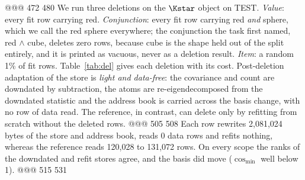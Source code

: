 @@@ 472 480
We run three deletions on the $\Kstar$ object on TEST. \emph{Value}: every fit row carrying
red. \emph{Conjunction}: every fit row carrying red \emph{and} sphere, which we call the red
sphere everywhere; the conjunction the task first named, red $\wedge$ cube, deletes zero rows,
because cube is the shape held out of the split entirely, and it is printed as vacuous, never as
a deletion result. \emph{Item}: a random 1\% of fit rows.
Table~\ref{tab:del} gives each deletion with its cost. Post-deletion adaptation of the store is
\emph{light and data-free}: the covariance and count are downdated by subtraction, the atoms are
re-eigendecomposed from the downdated statistic and the address book is carried across the basis
change, with no row of data read. The reference, in contrast, can delete only by refitting from
scratch without the deleted rows.
@@@ 505 508
\noindent Each row rewrites 2,081,024 bytes of the store and address book, reads 0 data rows
and refits nothing, whereas the reference reads 120,028 to 131,072 rows. %
On every scope the ranks of the downdated and refit stores agree, and the basis did move
($\cos_{\min}$ well below 1). %
@@@ 515 531
